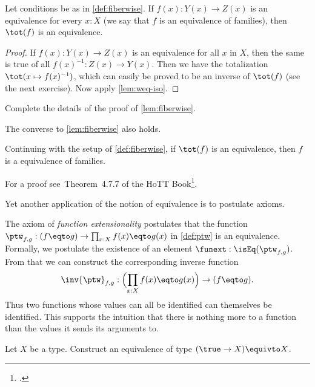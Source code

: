 \begin{lemma}\label{lem:fiberwise}
Let conditions be as in \cref{def:fiberwise}.
If $f(x): Y(x) \to Z(x)$ is an equivalence for every $x:X$
(we say that $f$ is an equivalence of families),
then $\tot(f)$ is an equivalence.
\end{lemma}
\begin{proof}
If $f(x): Y(x) \to Z(x)$ is an equivalence for all $x$ in $X$,
then the same is true of all $f(x)^{-1}: Z(x) \to Y(x)$.
Then we have the totalization $\tot(x\mapsto f(x)^{-1})$,
which can easily be proved to be an inverse of $\tot(f)$
(see the next exercise). Now apply \cref{lem:weq-iso}.
\end{proof}

\begin{xca}\label{xca:fiberwise}
Complete the details of the proof of \cref{lem:fiberwise}.
\end{xca}

The converse to \cref{lem:fiberwise} also holds.
\begin{lemma}\label{lem:fiberwise-equiv-from-tot}
  Continuing with the setup of \cref{def:fiberwise},
  if $\tot(f)$ is an equivalence, then $f$ is a equivalence of families.
\end{lemma}
For a proof see~Theorem~4.7.7 of the HoTT Book\footcite{hottbook}.

Yet another application of the notion of equivalence is to postulate axioms.

\begin{principle}\label{def:funext}
The axiom of \emph{function extensionality} postulates that the function
$\ptw_{f,g}: (f \eqto g) \to \prod_{x:X} f(x) \eqto g(x)$ in \cref{def:ptw} is an equivalence.
Formally, we postulate the existence of an element $\funext : \isEq(\ptw_{f,g})$.
From that we can construct the corresponding inverse function
\[
\inv{\ptw}_{f,g}: \Bigl(\prod_{x:X} f(x) \eqto g(x)\Bigr) \to (f \eqto g).
\]
Thus two functions whose values can all be identified can themselves be identified.
This supports the intuition that there is nothing more to a function than the values
it sends its arguments to.
\end{principle}

\begin{xca}\label{xca:Xequiv1toX}
  Let $X$ be a type.  Construct an equivalence of type $( \true \to X ) \equivto X $.
\end{xca}

